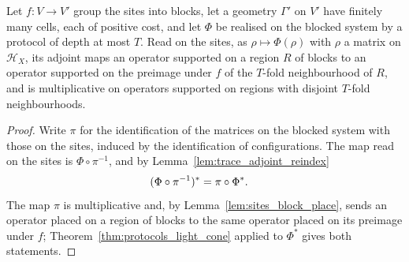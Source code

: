\begin{theorem}
    \label{thm:protocols_light_cone_block}
    \leanok
    Let $f:V\to V'$ group the sites into blocks, let a geometry $\Gamma'$ on $V'$ have
    finitely many cells, each of positive cost, and let $\Phi$ be realised on the blocked system
    by a protocol of depth at most $T$. Read on the sites, as $\rho\mapsto\Phi(\rho)$ with
    $\rho$ a matrix on $\mathcal H_X$, its adjoint maps an operator supported on a region $R$
    of blocks to an operator supported on the preimage under $f$ of the $T$-fold neighbourhood
    of $R$, and is multiplicative on operators supported on regions with disjoint $T$-fold
    neighbourhoods.
\end{theorem}
\begin{proof}\leanok
    Write $\pi$ for the identification of the matrices on the blocked system with those on
    the sites, induced by the identification of configurations. The map read on the sites is
    $\Phi\circ\pi^{-1}$, and by Lemma~\ref{lem:trace_adjoint_reindex}
    \begin{align}
        (\Phi\circ\pi^{-1})^*&=\pi\circ\Phi^*.
        \notag
    \end{align}
    The map $\pi$ is multiplicative and, by Lemma~\ref{lem:sites_block_place}, sends an
    operator placed on a region of blocks to the same operator placed on its preimage under
    $f$; Theorem~\ref{thm:protocols_light_cone} applied to $\Phi^*$ gives both statements.
\end{proof}

